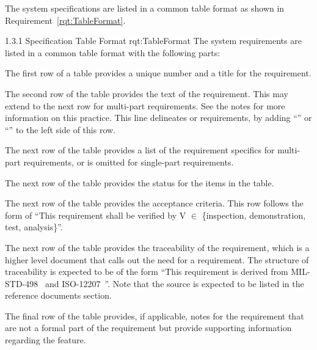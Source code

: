 
The system specifications are listed in a common table format as shown in Requirement~\ref{rqt:TableFormat}.

\MULTIRQMTV
{1.3.1}
{Specification Table Format}
{rqt:TableFormat}
{The system requirements are listed in a common table format with the following parts:}
{\small
 \item The first row of a table provides a unique number and a title for the requirement.

 \item The second row of the table provides the text of the requirement. This may extend to the next row for multi-part requirements. See the notes for more information on this practice. This line delineates \KPP or \KSA requirements, by adding ``\KPP'' or ``\KSA'' to the left side of this row.

 \item The next row of the table provides a list of the requirement specifics for multi-part requirements, or is omitted for single-part requirements.   
 
 \item The next row of the table provides the status for the items in the table. 

 \item The next row of the table provides the acceptance criteria. This row follows the form of ``This requirement shall be verified by V $\in$ \{inspection, demonstration, test, analysis\}''.

 \item The next row of the table provides the traceability of the requirement, which is a higher level document that calls out the need for a requirement. The structure of traceability is expected to be of the form ``This requirement is derived from MIL-STD-498~\cite{ref__MIL_STD_498} and ISO-12207~\cite{ref__ISO_12207}''. Note that the source is expected to be listed in the reference documents section.

 \item The final row of the table provides, if applicable, notes for the requirement that are not a formal part of the requirement but provide supporting information regarding the feature.
}
